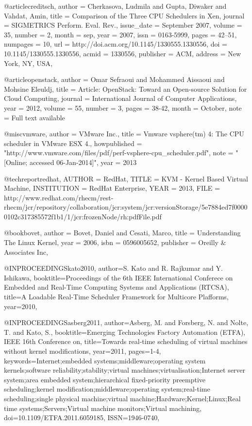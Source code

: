 @article{creditsch,
 author = {Cherkasova, Ludmila and Gupta, Diwaker and Vahdat, Amin},
 title = {Comparison of the Three CPU Schedulers in Xen},
 journal = {SIGMETRICS Perform. Eval. Rev.},
 issue_date = {September 2007},
 volume = {35},
 number = {2},
 month = sep,
 year = {2007},
 issn = {0163-5999},
 pages = {42--51},
 numpages = {10},
 url = {http://doi.acm.org/10.1145/1330555.1330556},
 doi = {10.1145/1330555.1330556},
 acmid = {1330556},
 publisher = {ACM},
 address = {New York, NY, USA},
} 

@article{openstack,
	author = {Omar Sefraoui and Mohammed Aissaoui and Mohsine Eleuldj},
	title = {Article: OpenStack: Toward an Open-source Solution for Cloud Computing},
	journal = {International Journal of Computer Applications},
	year = {2012},
	volume = {55},
	number = {3},
	pages = {38-42},
	month = {October},
	note = {Full text available}
}

@misc{vmware,
  author = {VMware Inc.},
  title = {Vmware vsphere(tm) 4: The CPU scheduler in VMware ESX 4.},
  howpublished = "http://www.vmware.com/files/pdf/perf-vsphere-cpu\_scheduler.pdf",
  note = "[Online; accessed 06-Jan-2014]",
  year = 2013
}

@techreport{redhat,
  AUTHOR =        {RedHat},
  TITLE =         {KVM - Kernel Based Virtual Machine},
  INSTITUTION =   {RedHat Enterprise},
  YEAR  =         {2013},
  FILE  =         {http://www.redhat.com/rhecm/rest-rhecm/jcr/repository/collaboration/jcr:system/jcr:versionStorage/5e7884ed7f00000102c317385572f1b1/1/jcr:frozenNode/rh:pdfFile.pdf}
}


@book{bovet,
 author = {Bovet, Daniel and Cesati, Marco},
 title = {Understanding The Linux Kernel},
 year = {2006},
 isbn = {0596005652},
 publisher = {Oreilly \& Associates Inc},
} 

@INPROCEEDINGS{kato2010, 
author={S. Kato and R. Rajkumar and Y. Ishikawa}, 
booktitle={Proceedings of the 6th IEEE International Conferece on Embedded and Real-Time Computing Systems and Applications (RTCSA)}, 
title={A Loadable Real-Time Scheduler Framework for Multicore Plafforms}, 
year={2010}, 
}

@INPROCEEDINGS{asberg2011, 
author={Asberg, M. and Forsberg, N. and Nolte, T. and Kato, S.}, 
booktitle={Emerging Technologies Factory Automation (ETFA), IEEE 16th Conference on}, 
title={Towards real-time scheduling of virtual machines without kernel modifications}, 
year={2011}, 
pages={1-4}, 
keywords={Internet;embedded systems;middleware;operating system kernels;software reliability;stability;virtual machines;virtualisation;Internet server system;area embedded system;hierarchical fixed-priority preemptive scheduling;kernel modification;middleware;operating system;real-time scheduling;single physical machine;virtual machine;Hardware;Kernel;Linux;Real time systems;Servers;Virtual machine monitors;Virtual machining}, 
doi={10.1109/ETFA.2011.6059185}, 
ISSN={1946-0740},}

